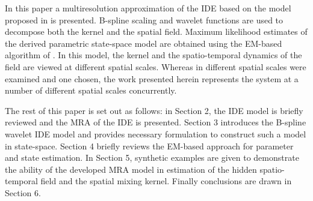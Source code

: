 \documentclass[draftcls,onecolumn]{IEEEtran}
\begin{document}
In this paper a multiresolution approximation of the IDE based on the model proposed in \cite{Dewar2009} is presented. B-spline scaling and wavelet functions are used to decompose both the kernel and the spatial field. Maximum likelihood estimates of the derived parametric state-space model are obtained using the EM-based algorithm of  \cite{Dewar2009}.  In this model, the kernel and the spatio-temporal dynamics of the field are viewed at different spatial scales. Whereas in \cite{Scerri2009} different spatial scales were examined and one chosen, the work presented herein represents the system at a number of different spatial scales concurrently.


  The rest of this paper is set out as follows: in Section 2, the IDE model is briefly reviewed and the MRA of the IDE is presented. Section 3 introduces the B-spline wavelet IDE model and provides necessary formulation  to construct such a model in state-space. Section 4 briefly reviews the EM-based approach for parameter and state estimation. In Section 5, synthetic examples are given to demonstrate the ability of the developed MRA model in estimation of the hidden spatio-temporal field and the spatial mixing kernel. Finally conclusions are drawn in Section 6.





 



\end{document}
